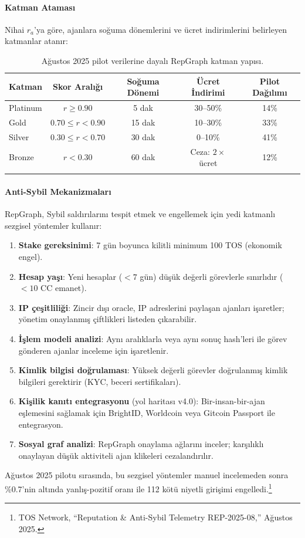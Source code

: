 \documentclass[11pt]{article}
\begin{document}
\paragraph{Katman Ataması} Nihai $r_a$'ya göre, ajanlara soğuma dönemlerini ve ücret indirimlerini belirleyen katmanlar atanır:
\begin{longtable}{@{}lcccc@{}}
\toprule
\textbf{Katman} & \textbf{Skor Aralığı} & \textbf{Soğuma Dönemi} & \textbf{Ücret İndirimi} & \textbf{Pilot Dağılımı} \\\midrule
Platinum & $r \geq 0.90$ & 5 dak & 30--50\% & 14\% \\
Gold & $0.70 \leq r < 0.90$ & 15 dak & 10--30\% & 33\% \\
Silver & $0.30 \leq r < 0.70$ & 30 dak & 0--10\% & 41\% \\
Bronze & $r < 0.30$ & 60 dak & Ceza: $2 \times$ ücret & 12\% \\\bottomrule
\caption{Ağustos 2025 pilot verilerine dayalı RepGraph katman yapısı.}
\label{tab:reputation-tiers}
\end{longtable}

\paragraph{Anti-Sybil Mekanizmaları} RepGraph, Sybil saldırılarını tespit etmek ve engellemek için yedi katmanlı sezgisel yöntemler kullanır:
\begin{enumerate}[noitemsep]
  \item \textbf{Stake gereksinimi}: 7 gün boyunca kilitli minimum 100 TOS (ekonomik engel).
  \item \textbf{Hesap yaşı}: Yeni hesaplar ($<7$ gün) düşük değerli görevlerle sınırlıdır ($<10$ CC emanet).
  \item \textbf{IP çeşitliliği}: Zincir dışı oracle, IP adreslerini paylaşan ajanları işaretler; yönetim onaylanmış çiftlikleri listeden çıkarabilir.
  \item \textbf{İşlem modeli analizi}: Aynı aralıklarla veya aynı sonuç hash'leri ile görev gönderen ajanlar inceleme için işaretlenir.
  \item \textbf{Kimlik bilgisi doğrulaması}: Yüksek değerli görevler doğrulanmış kimlik bilgileri gerektirir (KYC, beceri sertifikaları).
  \item \textbf{Kişilik kanıtı entegrasyonu} (yol haritası v4.0): Bir-insan-bir-ajan eşlemesini sağlamak için BrightID, Worldcoin veya Gitcoin Passport ile entegrasyon.
  \item \textbf{Sosyal graf analizi}: RepGraph onaylama ağlarını inceler; karşılıklı onaylayan düşük aktiviteli ajan klikeleri cezalandırılır.
\end{enumerate}
Ağustos 2025 pilotu sırasında, bu sezgisel yöntemler manuel incelemeden sonra \%0.7'nin altında yanlış-pozitif oranı ile 112 kötü niyetli girişimi engelledi.\footnote{TOS Network, ``Reputation \& Anti-Sybil Telemetry REP-2025-08,'' Ağustos 2025.}
\end{document}
